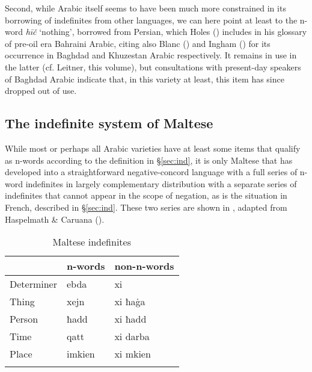 \documentclass[output=paper]{langsci/langscibook}
\begin{document}
Second, while Arabic itself seems to have been much more constrained in its borrowing of indefinites from other languages, we can here point at least to the n-word \textit{hīč} ‘nothing’, borrowed from Persian, which Holes (\citeyear[549]{Holes2001}) includes in his glossary of pre-oil era Bahraini Arabic, citing also Blanc (\citeyear[159]{Blanc1964}) and Ingham (\citeyear[547]{Ingham1973}) for its occurrence in Baghdad and Khuzestan Arabic respectively. It remains in use in the latter (cf. Leitner, this volume), but consultations with present-day speakers of Baghdad Arabic indicate that, in this variety at least, this item has since dropped out of use.



\subsection{The indefinite system of Maltese}


While most or perhaps all Arabic varieties have at least some items that qualify as n-words according to the definition in §\ref{sec:ind}, it is only Maltese that has developed into a straightforward negative-concord language with a full series of n-word indefinites in largely complementary distribution with a separate series of indefinites that cannot appear in the scope of negation, as is the situation in French, described in §\ref{sec:ind}. These two series are shown in , adapted from Haspelmath \& Caruana (\citeyear[215]{HaspelmathCaruana1996}).

\begin{table}
\begin{tabularx}{.66\textwidth}{XXX} 
\lsptoprule
& n-words & non-n-words\\
\midrule
Determiner & ebda & xi\\
Thing & xejn & xi ħa\.ga\\
Person & ħadd & xi ħadd\\
Time & qatt & xi darba\\
Place & imkien & xi mkien\\
\lspbottomrule
\end{tabularx}
\caption{Maltese indefinites}
\label{tab:negation:malteseindefinites}
\end{table}
\end{document}
